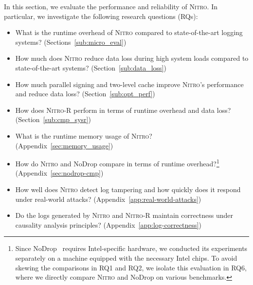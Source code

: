 \documentclass[sigconf]{sty/acmart}
\newcommand{\Sys}{\mbox{\textsc{Nitro}}\xspace}
\newcommand{\SysR}{\mbox{\textsc{Nitro-R}}\xspace}
\newcommand{\nodrop}{NoDrop\xspace}
\begin{document}
In this section, we evaluate the performance and reliability of \Sys. In particular, we investigate the following research questions (RQs):

\begin{itemize}

    \item[\textit{RQ1}] What is the runtime overhead of \Sys compared to state-of-the-art logging systems?
		(Sections~\ref{sub:micro_eval})
    
    \item[\textit{RQ2}] How much does \Sys reduce data loss during high system loads compared to state-of-the-art systems? (Section~\ref{sub:data_loss})
    
    \item[\textit{RQ3}] How much parallel signing and two-level cache improve \Sys’s performance and reduce data loss? (Section~\ref{sub:opt_perf})

    \item[\textit{RQ4}] How does \SysR perform in terms of runtime overhead and data loss? (Section~\ref{sub:cmp_sysr})
    
    \item[\textit{RQ5}] What is the runtime memory usage of \Sys? (Appendix~\ref{sec:memory_usage})

    \item[\textit{RQ6}] How do \Sys and \nodrop compare in terms of runtime overhead?\footnote{Since \nodrop~\cite{nodrop} requires Intel-specific hardware, we conducted its experiments separately on a machine equipped with the necessary Intel chips. To avoid skewing the comparisons in RQ1 and RQ2, we isolate this evaluation in RQ6, where we directly compare \Sys and \nodrop on various benchmarks.} (Appendix~\ref{sec:nodrop-cmp})

    \item[\textit{RQ7}] How well does \Sys detect log tampering and how quickly does it respond under real-world attacks? (Appendix~\ref{app:real-world-attacks})
    
    \item[\textit{RQ8}] Do the logs generated by \Sys and \SysR maintain correctness under causality analysis principles? (Appendix~\ref{app:log-correctness})

\end{itemize}
\end{document}
